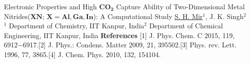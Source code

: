 \begin{abstract_online}{Electronic Properties and High $\mathbf{CO_2}$ Capture Ability of Two-Dimensional Metal Nitrides($\mathbf{XN}$; $\mathbf{X = Al, Ga, In}$): A Computational Study}{%
        \underline{S. H. Mir}$^{1}$, J. K. Singh$^{2}$}{%
        }{%
        $^1$ Department of Chemistry, IIT Kanpur, India\newline{}$^2$ Department of Chemical Engineering, IIT Kanpur, India}
        \textbf{References} \newline{}[1] J. Phys. Chem. C 2015, 119, 6912−6917.\newline{}[2] J. Phys.: Condens. Matter 2009, 21, 395502.\newline{}[3] Phys. rev. Lett. 1996, 77, 3865.\newline{}[4] J. Chem. Phys. 2010, 132, 154104.
    \end{abstract_online}
    